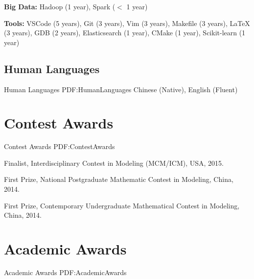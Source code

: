 \documentclass[letterpaper,10pt,oneside]{article}
\begin{document}
\begin{body}
\GapNoBreak
\BulletItem
\textbf{Big Data:} Hadoop (1 year), Spark ($<$ 1 year)

\GapNoBreak
\BulletItem
\textbf{Tools:} VSCode (5 years), Git (3 years), Vim (3 years), Makefile (3 years), {\LaTeX} (3 years), GDB (2 years), Elasticsearch (1 year), CMake (1 year), Scikit-learn (1 year)

\subsection
{Human Languages}
{Human Languages}
{PDF:HumanLanguages}
\GapNoBreak
\BulletItem
Chinese (Native), English (Fluent)
\GapNoBreak


\section
{Contest Awards}
{Contest Awards}
{PDF:ContestAwards}


\BulletItem
Finalist, Interdisciplinary Contest in Modeling (MCM/ICM), USA, 2015.

\Gap
\BulletItem
First Prize, National Postgraduate Mathematic Contest in Modeling, China, 2014.

\Gap
\BulletItem
First Prize, Contemporary Undergraduate Mathematical Contest in Modeling, China, 2014.

\iffalse
\section
{Academic Awards}
{Academic Awards}
{PDF:AcademicAwards}


\end{body}
\end{document}
